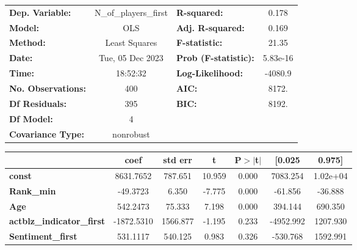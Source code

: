 \documentclass{report}
\begin{document}
\begin{center}
\begin{tabular}{lclc}
\toprule
\textbf{Dep. Variable:}           & N\_of\_players\_first & \textbf{  R-squared:         } &     0.178   \\
\textbf{Model:}                   &          OLS          & \textbf{  Adj. R-squared:    } &     0.169   \\
\textbf{Method:}                  &     Least Squares     & \textbf{  F-statistic:       } &     21.35   \\
\textbf{Date:}                    &    Tue, 05 Dec 2023   & \textbf{  Prob (F-statistic):} &  5.83e-16   \\
\textbf{Time:}                    &        18:52:32       & \textbf{  Log-Likelihood:    } &   -4080.9   \\
\textbf{No. Observations:}        &            400        & \textbf{  AIC:               } &     8172.   \\
\textbf{Df Residuals:}            &            395        & \textbf{  BIC:               } &     8192.   \\
\textbf{Df Model:}                &              4        & \textbf{                     } &             \\
\textbf{Covariance Type:}         &       nonrobust       & \textbf{                     } &             \\
\bottomrule
\end{tabular}
\begin{tabular}{lcccccc}
                                  & \textbf{coef} & \textbf{std err} & \textbf{t} & \textbf{P$> |$t$|$} & \textbf{[0.025} & \textbf{0.975]}  \\
\midrule
\textbf{const}                    &    8631.7652  &      787.651     &    10.959  &         0.000        &     7083.254    &     1.02e+04     \\
\textbf{Rank\_min}                &     -49.3723  &        6.350     &    -7.775  &         0.000        &      -61.856    &      -36.888     \\
\textbf{Age}                      &     542.2473  &       75.333     &     7.198  &         0.000        &      394.144    &      690.350     \\
\textbf{actblz\_indicator\_first} &   -1872.5310  &     1566.877     &    -1.195  &         0.233        &    -4952.992    &     1207.930     \\
\textbf{Sentiment\_first}         &     531.1117  &      540.125     &     0.983  &         0.326        &     -530.768    &     1592.991     \\

\end{tabular}
\end{center}
\end{document}
